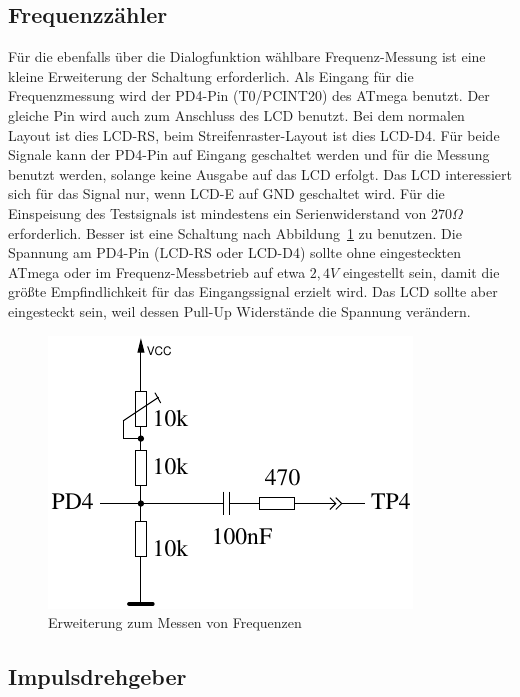 \subsection{Frequenzzähler}
\label{sec:frequency_counter}

Für die ebenfalls über die Dialogfunktion wählbare Frequenz-Messung ist eine kleine Erweiterung
der Schaltung erforderlich. Als Eingang für die Frequenzmessung wird der PD4-Pin (T0/PCINT20) des
ATmega benutzt. Der gleiche Pin wird auch zum Anschluss des LCD benutzt. Bei dem normalen Layout
ist dies LCD-RS, beim Streifenraster-Layout ist dies LCD-D4. Für beide Signale kann der PD4-Pin
auf Eingang geschaltet werden und für die Messung benutzt werden, solange keine Ausgabe auf das
LCD erfolgt. Das LCD interessiert sich für das Signal nur, wenn LCD-E auf GND geschaltet wird.
Für die Einspeisung des Testsignals ist mindestens ein Serienwiderstand von \(270\Omega\) erforderlich.
Besser ist eine Schaltung nach Abbildung~\ref{fig:FreqMes} zu benutzen. Die Spannung am PD4-Pin (LCD-RS oder
LCD-D4) sollte ohne eingesteckten ATmega oder im Frequenz-Messbetrieb auf etwa \(2,4V\) eingestellt sein,
damit die größte Empfindlichkeit für das Eingangssignal erzielt wird. Das LCD sollte aber eingesteckt sein,
weil dessen Pull-Up Widerstände die Spannung verändern.

\begin{figure}[H]
\centering
\includegraphics[width=.4\textwidth]{../FIG/Frequency_addon.pdf}	%
\caption{Erweiterung zum Messen von Frequenzen}
\label{fig:FreqMes}
\end{figure}

\subsection{Impulsdrehgeber}

